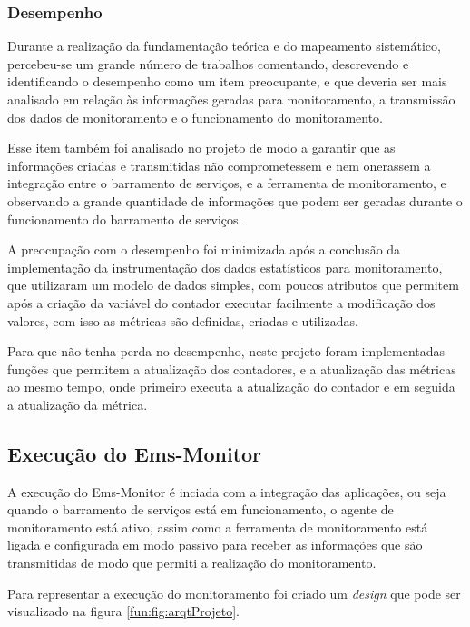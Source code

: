 \subsubsection{Desempenho}

Durante a realização da fundamentação teórica e do mapeamento sistemático, percebeu-se um grande número de trabalhos comentando, descrevendo e identificando o desempenho como um item preocupante, e que deveria ser mais analisado em relação às informações geradas para monitoramento, a transmissão dos dados de monitoramento e o funcionamento do monitoramento.  

Esse item também foi analisado no projeto de modo a garantir que as informações criadas e transmitidas não comprometessem e nem onerassem a integração entre o barramento de serviços, e a ferramenta de monitoramento, e observando a grande quantidade de informações que podem ser geradas durante o funcionamento do barramento de serviços. 

A preocupação com o desempenho foi minimizada após a conclusão da implementação da instrumentação dos dados estatísticos para monitoramento, que utilizaram um modelo de dados simples, com poucos atributos que permitem após a criação da variável do contador executar facilmente a modificação dos valores, com isso as métricas são definidas,  criadas e utilizadas. 

Para que não tenha perda no desempenho, neste projeto foram implementadas funções que permitem a atualização dos contadores, e a atualização das métricas ao mesmo tempo, onde primeiro executa a atualização do contador e em seguida a atualização da métrica.      


\subsection{Execução do Ems-Monitor}

A execução do Ems-Monitor é inciada com a integração das aplicações, ou seja quando o barramento de serviços está em funcionamento, o agente de monitoramento está ativo, assim como a ferramenta de monitoramento está ligada e configurada em modo passivo para receber as informações que são transmitidas de modo que permiti a realização do monitoramento. 

Para representar a execução do monitoramento foi criado um \textit{design} que pode ser visualizado na figura \ref{fun:fig:arqtProjeto}. 

